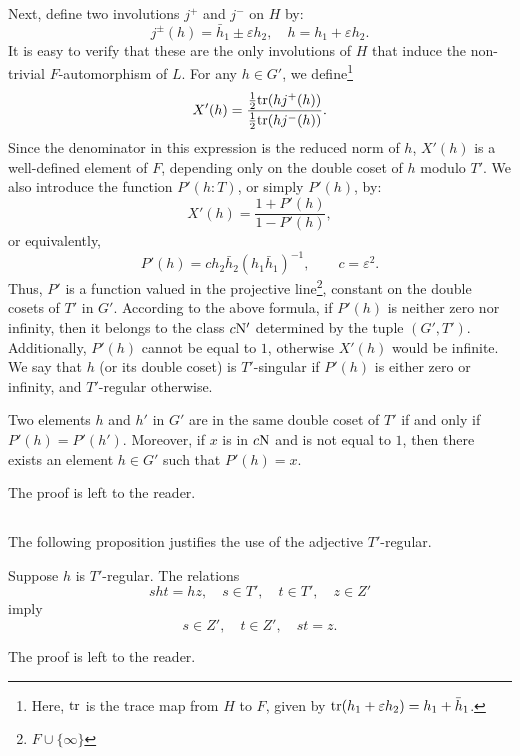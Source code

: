 Next, define two involutions $j^+$ and $j^-$ on $H$ by:
\begin{equation}
    j^{\pm}(h) = \bar{h}_1 \pm \varepsilon h_2, \quad h = h_1 + \varepsilon h_2.
\end{equation}
It is easy to verify that these are the only involutions of $H$ that induce the non-trivial $F$-automorphism of $L$.
For any $h \in G'$, we define\footnote{Here, $\mathrm{tr}$ is the trace map from $H$ to $F$, given by $\mathrm{tr}(h_1 + \varepsilon h_2) = h_1 + \bar{h}_1$.}
\begin{equation}
    \label{eqn:1.1.4}
    X'(h) = \frac{\frac{1}{2}\mathrm{tr}(hj^+(h))}{\frac{1}{2}\mathrm{tr}(hj^{-}(h))}.
\end{equation}
Since the denominator in this expression is the reduced norm of $h$, $X'(h)$ is a well-defined element of $F$, depending only on the double coset of $h$ modulo $T'$. We also introduce the function $P'(h:T)$, or simply $P'(h)$, by:
\begin{equation}
    X'(h) = \frac{1 + P'(h)}{1 - P'(h)},
\end{equation}
or equivalently,
\begin{equation}
    P'(h) = c h_2 \bar{h}_2 (h_1 \bar{h}_1)^{-1}, \qquad c = \varepsilon^2.
\end{equation}
Thus, $P'$ is a function valued in the projective line\footnote{$F \cup \{\infty\}$}, constant on the double cosets of $T'$ in $G'$.
According to the above formula, if $P'(h)$ is neither zero nor infinity, then it belongs to the class $c\mathrm{N}'$ determined by the tuple $(G', T')$.
Additionally, $P'(h)$ cannot be equal to $1$, otherwise $X'(h)$ would be infinite.
We say that $h$ (or its double coset) is $T'$-singular if $P'(h)$ is either zero or infinity, and $T'$-regular otherwise.

\begin{proposition}
Two elements $h$ and $h'$ in $G'$ are in the same double coset of $T'$ if and only if $P'(h) = P'(h')$.
Moreover, if $x$ is in $c\mathrm{N}$ and is not equal to $1$, then there exists an element $h \in G'$ such that $P'(h) = x$.
\end{proposition}
The proof is left to the reader.

\subsection{}
The following proposition justifies the use of the adjective $T'$-regular.
\begin{proposition}
Suppose $h$ is $T'$-regular.    
The relations
\[
sht = hz,\quad s \in T',\quad t\in T', \quad z \in Z'
\]
imply
\[
s \in Z',\quad t\in Z',\quad st = z.
\]
\end{proposition}
The proof is left to the reader.

